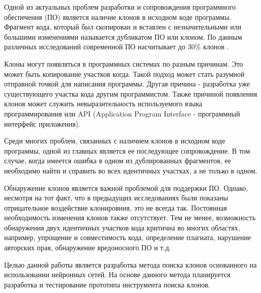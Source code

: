 \intro
Одной из актуальных проблем разработки и сопровождения программного обеспечения (ПО) является наличие клонов в исходном коде программы. Фрагмент кода, который был скопирован и вставлен с незначительными или большими изменениями называется дубликатом ПО или клоном. По данным различных исследований современной ПО насчитывает до 30\% клонов \cite{royandcordy}.

Клоны могут появляться в программных системах по разным причинам. Это может быть копирование участков когда. Такой подход может стать разумной отправной точкой для написания программы. Другая причина - разработка уже существующего участка кода другим программистом. Также причиной появления клонов может служить невыразительность используемого языка программирования или API (Application Program Interface - программный интерфейс приложения).

Среди многих проблем, связанных с наличием клонов в исходном коде программы, одной из главных является ее последующее сопровождение. В том случае, когда имеется ошибка в одном из дублированных фрагментов, ее необходимо найти и справить во всех идентичных участках, а не только в одном.

Обнаружение клонов является важной проблемой для поддержки ПО. Однако, несмотря на тот факт, что в предыдущих исследованиях были показаны отрицательное воздействие клонировния, это не всегда так. Постоянная необходимость изменения клонов также отсутствует. Тем не менее, возможность обнаружения двух идентичных участков кода критична во многих областях, например, упрощение и совместимость кода, определение плагиата, нарушение авторских прав, обнаружение вредоносного ПО и т.д.

Целью данной работы является разработка метода поиска клонов основанного на использовании нейронных сетей. На основе данного метода планируется разработка и тестирование прототипа инструмента поиска клонов.
